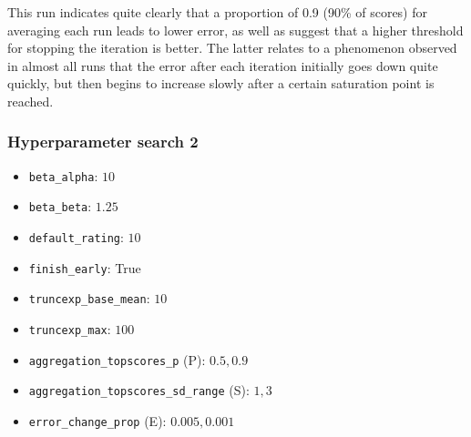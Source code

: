 \documentclass[12pt,a4paper]{article}
\begin{document}

This run indicates quite clearly that a proportion of 0.9 (90\% of scores) for averaging each run leads to lower error, as well as suggest that a higher threshold for stopping the iteration is better. The latter relates to a phenomenon observed in almost all runs that the error after each iteration initially goes down quite quickly, but then begins to increase slowly after a certain saturation point is reached.

\subsubsection{Hyperparameter search 2}


\begin{itemize}

\item \lstinline|beta_alpha|: $10$
\item \lstinline|beta_beta|: $1.25$
\item \lstinline|default_rating|: $10$
\item \lstinline|finish_early|: True
\item \lstinline|truncexp_base_mean|: $10$
\item \lstinline|truncexp_max|: $100$

\end{itemize}


\begin{itemize}

\item \lstinline|aggregation_topscores_p| (P): $0.5, 0.9$
\item \lstinline|aggregation_topscores_sd_range| (S): $1, 3$
\item \lstinline|error_change_prop| (E): $0.005, 0.001$

\end{itemize}


\begin{center}
\end{center}
\end{document}
